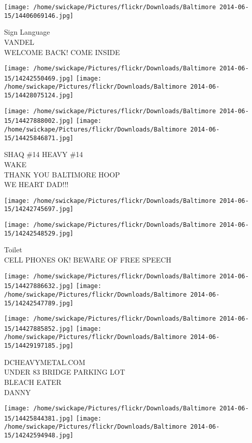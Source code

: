 \documentclass[10pt,letterpaper]{article}
\begin{document}
\vspace{0.25in}
\texttt{[image: /home/swickape/Pictures/flickr/Downloads/Baltimore 2014-06-15/14406069146.jpg]}

Sign Language\\
VANDEL\\
WELCOME BACK!  COME INSIDE
\pagebreak

\texttt{[image: /home/swickape/Pictures/flickr/Downloads/Baltimore 2014-06-15/14242550469.jpg]}
\texttt{[image: /home/swickape/Pictures/flickr/Downloads/Baltimore 2014-06-15/14428075124.jpg]}

\texttt{[image: /home/swickape/Pictures/flickr/Downloads/Baltimore 2014-06-15/14427888002.jpg]}
\texttt{[image: /home/swickape/Pictures/flickr/Downloads/Baltimore 2014-06-15/14425846871.jpg]}

SHAQ \#14 HEAVY \#14\\
WAKE\\
THANK YOU BALTIMORE HOOP\\
WE HEART DAD!!!
\pagebreak

\texttt{[image: /home/swickape/Pictures/flickr/Downloads/Baltimore 2014-06-15/14242745697.jpg]}

\vspace{0.25in}
\texttt{[image: /home/swickape/Pictures/flickr/Downloads/Baltimore 2014-06-15/14242548529.jpg]}

Toilet\\
CELL PHONES OK!  BEWARE OF FREE SPEECH
\pagebreak

\texttt{[image: /home/swickape/Pictures/flickr/Downloads/Baltimore 2014-06-15/14427886632.jpg]}
\texttt{[image: /home/swickape/Pictures/flickr/Downloads/Baltimore 2014-06-15/14242547789.jpg]}

\texttt{[image: /home/swickape/Pictures/flickr/Downloads/Baltimore 2014-06-15/14427885852.jpg]}
\texttt{[image: /home/swickape/Pictures/flickr/Downloads/Baltimore 2014-06-15/14429197185.jpg]}

DCHEAVYMETAL.COM\\
UNDER 83 BRIDGE PARKING LOT\\
BLEACH EATER\\
DANNY
\pagebreak

\texttt{[image: /home/swickape/Pictures/flickr/Downloads/Baltimore 2014-06-15/14425844381.jpg]}
\texttt{[image: /home/swickape/Pictures/flickr/Downloads/Baltimore 2014-06-15/14242594948.jpg]}
\end{document}
